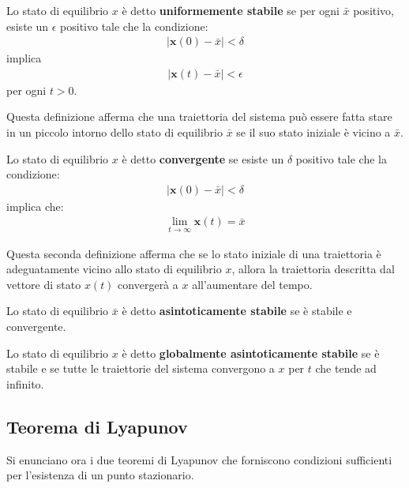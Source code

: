 \begin{mydef}
    Lo stato di equilibrio $x$ è detto \textbf{uniformemente stabile} se per ogni $\bar{x}$ positivo, esiste un $\epsilon$ positivo tale che la condizione:
    \begin{align*}
        \left|\mathbf{x}(0) - \bar{x} \right| < \delta
    \end{align*}
    implica
    \begin{align*}
        \left|\mathbf{x}(t) - \bar{x} \right| < \epsilon
    \end{align*}
    per ogni $t > 0$.
\end{mydef}

Questa definizione afferma che una traiettoria del sistema può essere fatta stare in un piccolo
intorno dello stato di equilibrio $\bar{x}$ se il suo stato iniziale è vicino a $\bar{x}$.

\begin{mydef}
    Lo stato di equilibrio $x$ è detto \textbf{convergente} se esiste un $\delta$ positivo tale che la
    condizione:
    \begin{align*}
        \left|\mathbf{x}(0) - \bar{x} \right| < \delta
    \end{align*}
    implica che:
    \begin{align*}
        \lim_{t \rightarrow \infty} \mathbf{x}(t) = \bar{x}
    \end{align*}
\end{mydef}
Questa seconda definizione afferma che se lo stato iniziale di una traiettoria è adeguatamente vicino allo stato di equilibrio $x$, allora la traiettoria descritta dal vettore di stato $x(t)$ convergerà a $x$ all'aumentare del tempo.
\begin{mydef}
    Lo stato di equilibrio $\bar{x}$ è detto \textbf{asintoticamente stabile} se è stabile e convergente.
\end{mydef}
\begin{mydef}
    Lo stato di equilibrio $x$ è detto \textbf{globalmente asintoticamente stabile} se è stabile e se
    tutte le traiettorie del sistema convergono a $x$ per $t$ che tende ad infinito.
\end{mydef}

\newpage


\subsection{Teorema di Lyapunov} %
\label{sub:teorema_di_lyapunov}
Si enunciano ora i due teoremi di Lyapunov che forniscono condizioni sufficienti per l'esistenza di un punto stazionario.

